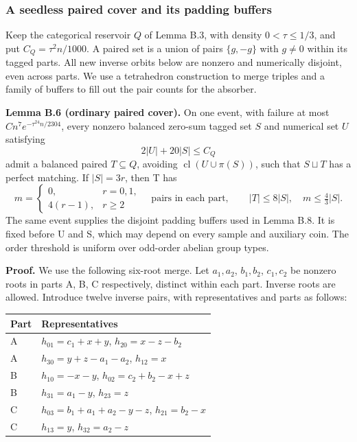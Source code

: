 \documentclass[11pt,a4paper]{article}
\newcommand{\statementstart}{\par\addvspace{6pt plus 1pt minus 1pt}\noindent}
\newcommand{\labelledparagraphstart}{\par\addvspace{3pt plus 1pt minus 1pt}\noindent}
\begin{document}
\hypertarget{a-seedless-paired-cover-and-its-padding-buffers}{%
\subsubsection{A seedless paired cover and its padding buffers}\label{a-seedless-paired-cover-and-its-padding-buffers}}

Keep the categorical reservoir \(Q\) of Lemma B.3, with density \(0<\tau\le1/3\), and put \(C_Q=\tau^2n/1000\). A paired set is a union of pairs \(\{g,-g\}\) with \(g\ne0\) within its tagged parts. All new inverse orbits below are nonzero and numerically disjoint, even across parts. We use a tetrahedron construction to merge triples and a family of buffers to fill out the pair counts for the absorber.

\statementstart\textbf{Lemma B.6 (ordinary paired cover).} On one event, with failure at most \(Cn^7e^{-\tau^{24}n/2304}\), every nonzero balanced zero-sum tagged set \(S\) and numerical set \(U\) satisfying \begin{equation}
2|U|+20|S|\le C_Q
\tag{PC2}\label{eq:PC2}
\end{equation} admit a balanced paired \(T\subseteq Q\), avoiding \(\operatorname{cl}(U\cup\pi(S))\), such that \(S\sqcup T\) has a perfect matching. If \(|S|=3r\), then T has \begin{equation}
m=\begin{cases}0,&r=0,1,\\4(r-1),&r\ge2\end{cases}
\quad\text{pairs in each part},\qquad
|T|\le8|S|,\quad m\le\tfrac43|S|.
\tag{PC3}\label{eq:PC3}
\end{equation} The same event supplies the disjoint padding buffers used in Lemma B.8. It is fixed before U and S, which may depend on every sample and auxiliary coin. The order threshold is uniform over odd-order abelian group types.

\labelledparagraphstart\textbf{Proof.} We use the following six-root merge. Let \(a_1,a_2\), \(b_1,b_2\), \(c_1,c_2\) be nonzero roots in parts A, B, C respectively, distinct within each part. Inverse roots are allowed. Introduce twelve inverse pairs, with representatives and parts as follows:

\begin{longtable}[]{@{}ll@{}}
\toprule\noalign{}
Part & Representatives \\
\midrule\noalign{}
\endhead
\bottomrule\noalign{}
\endlastfoot
A & \(h_{01}=c_1+x+y\), \(h_{20}=x-z-b_2\) \\
A & \(h_{30}=y+z-a_1-a_2\), \(h_{12}=x\) \\
B & \(h_{10}=-x-y\), \(h_{02}=c_2+b_2-x+z\) \\
B & \(h_{31}=a_1-y\), \(h_{23}=z\) \\
C & \(h_{03}=b_1+a_1+a_2-y-z\), \(h_{21}=b_2-x\) \\
C & \(h_{13}=y\), \(h_{32}=a_2-z\) \\
\end{longtable}
\end{document}
